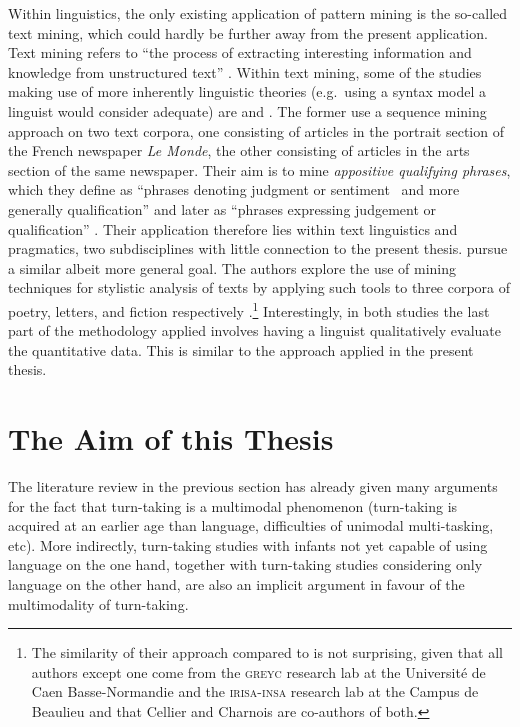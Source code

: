 Within linguistics, the only existing application of pattern mining is the so-called text mining, which could hardly be further away from the present application.
Text mining refers to ``the process of extracting interesting information and knowledge from unstructured text'' \citep[]{hotho_brief_2005}. Within text mining, some of the studies making use of more inherently linguistic theories (e.g.~using a syntax model a linguist would consider adequate) are \citet{bechet_discovering_2012} and \citet{quiniou_what_2012}.
The former use a sequence mining approach on two text corpora, one consisting of articles in the portrait section of the French newspaper \emph{Le Monde}, the other consisting of articles in the arts section of the same newspaper.
Their aim is to mine \emph{appositive qualifying phrases}, which they define as ``phrases denoting judgment or sentiment \citeellipses\ and more generally qualification'' \citep[]{bechet_discovering_2012} and later as ``phrases expressing judgement or qualification'' \citep[]{bechet_discovering_2012}.
Their application therefore lies within text linguistics and pragmatics, two subdisciplines with little connection to the present thesis.
\citet{quiniou_what_2012} pursue a similar albeit more general goal.
The authors explore the use of mining techniques for stylistic analysis of texts by applying such tools to three corpora of poetry, letters, and fiction respectively \citep[]{quiniou_what_2012}.\footnote{%
The similarity of their approach compared to \citet{bechet_discovering_2012} is not surprising, given that all authors except one come from the \textsc{greyc} research lab at the Université de Caen Basse-Normandie and the \textsc{irisa-insa} research lab at the Campus de Beaulieu and that Cellier and Charnois are co-authors of both.}
Interestingly, in both studies the last part of the methodology applied involves having a linguist qualitatively evaluate the quantitative data.
This is similar to the approach applied in the present thesis.


\section{The Aim of this Thesis}
\label{sec:introaim}
The literature review in the previous section has already given many arguments for the fact that turn-taking is a multimodal phenomenon (turn-taking is acquired at an earlier age than language, difficulties of unimodal multi-tasking, etc). %
More indirectly, turn-taking studies with infants not yet capable of using language on the one hand, together with turn-taking studies considering only language on the other hand, are also an implicit argument in favour of the multimodality of turn-taking.






















